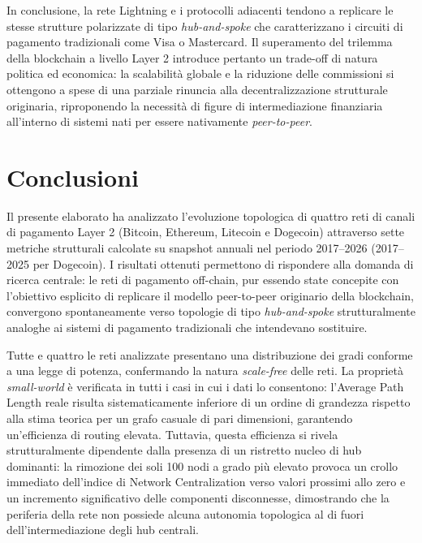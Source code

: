 \documentclass[12pt,a4paper,oneside]{book}
\begin{document}
In conclusione, la rete Lightning e i protocolli adiacenti tendono a replicare le stesse strutture polarizzate di tipo \textit{hub-and-spoke} che caratterizzano i circuiti di pagamento tradizionali come Visa o Mastercard. Il superamento del trilemma della blockchain a livello Layer 2 introduce pertanto un trade-off di natura politica ed economica: la scalabilità globale e la riduzione delle commissioni si ottengono a spese di una parziale rinuncia alla decentralizzazione strutturale originaria, riproponendo la necessità di figure di intermediazione finanziaria all'interno di sistemi nati per essere nativamente \textit{peer-to-peer}.

\chapter{Conclusioni}

Il presente elaborato ha analizzato l'evoluzione topologica di quattro reti di canali di pagamento Layer 2 (Bitcoin, Ethereum, Litecoin e Dogecoin) attraverso sette metriche strutturali calcolate su snapshot annuali nel periodo 2017--2026 (2017--2025 per Dogecoin). I risultati ottenuti permettono di rispondere alla domanda di ricerca centrale: le reti di pagamento off-chain, pur essendo state concepite con l'obiettivo esplicito di replicare il modello peer-to-peer originario della blockchain, convergono spontaneamente verso topologie di tipo \textit{hub-and-spoke} strutturalmente analoghe ai sistemi di pagamento tradizionali che intendevano sostituire.

Tutte e quattro le reti analizzate presentano una distribuzione dei gradi conforme a una legge di potenza, confermando la natura \textit{scale-free} delle reti. La proprietà \textit{small-world} è verificata in tutti i casi in cui i dati lo consentono: l'Average Path Length reale risulta sistematicamente inferiore di un ordine di grandezza rispetto alla stima teorica per un grafo casuale di pari dimensioni, garantendo un'efficienza di routing elevata. Tuttavia, questa efficienza si rivela strutturalmente dipendente dalla presenza di un ristretto nucleo di hub dominanti: la rimozione dei soli 100 nodi a grado più elevato provoca un crollo immediato dell'indice di Network Centralization verso valori prossimi allo zero e un incremento significativo delle componenti disconnesse, dimostrando che la periferia della rete non possiede alcuna autonomia topologica al di fuori dell'intermediazione degli hub centrali.
\end{document}
